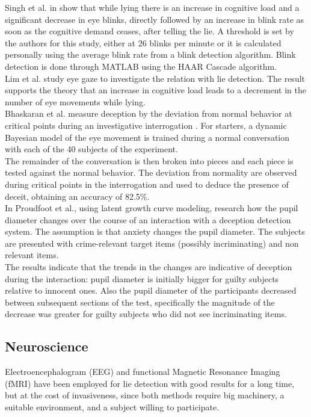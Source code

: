 Singh et al. in \cite{7324092} show that while lying there is an increase in cognitive load and a significant decrease in eye blinks, directly followed by an increase in blink rate as soon as the cognitive demand ceases, after telling the lie. A threshold is set by the authors for this study, either at 26 blinks per minute or it is calculated personally using the average blink rate from a blink detection algorithm. Blink detection is done through MATLAB using the HAAR Cascade algorithm. \\

Lim et al. study eye gaze \cite{Lim:2013:LTE:2535948.2535954} to investigate the relation with lie detection. The result supports the theory that an increase in cognitive load leads to a decrement in the number of eye movements while lying.\\

Bhaskaran et al. measure deception by the deviation from normal behavior at critical points during an investigative interrogation \cite{5771407} . For starters, a dynamic Bayesian model of the eye movement is trained during a normal conversation with each of the 40 subjects of the experiment. \\
The remainder of the conversation is then broken into pieces and each piece is tested against the normal behavior. The deviation from normality are observed during critical points in the interrogation and used to deduce the presence of deceit, obtaining an accuracy of 82.5\%. \\

In \cite{7165946} Proudfoot et al., using latent growth curve modeling, research how the pupil diameter changes over the course of an interaction with a deception detection system. The assumption is that anxiety changes the pupil diameter. The subjects are presented with crime-relevant target items (possibly incriminating) and non relevant items. \\
The results indicate that the trends in the changes are indicative of deception during the interaction: pupil diameter is initially bigger for guilty subjects relative to innocent ones. Also the pupil diameter of the participants decreased between subsequent sections of the test, specifically the magnitude of the decrease was greater for guilty subjects who did not see incriminating items. \\

\subsection*{Neuroscience}
Electroencephalogram (EEG) and functional Magnetic Resonance Imaging (fMRI) have been employed for lie detection with good results for a long time, but at the cost of invasiveness, since both methods require big machinery, a suitable environment, and a subject willing to participate. \\

